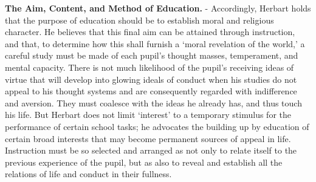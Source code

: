 \documentclass[
]{book}
\begin{document}
\textbf{The Aim, Content, and Method of Education.} - Accordingly, Herbart holds that the purpose of education should be to establish moral and religious character. He believes that this final aim can be attained through instruction, and that, to determine how this shall furnish a `moral revelation of the world,' a careful study must be made of each pupil's thought masses, temperament, and mental capacity. There is not much likelihood of the pupil's receiving ideas of virtue that will develop into glowing ideals of conduct when his studies do not appeal to his thought systems and are consequently regarded with indifference and aversion. They must coalesce with the ideas he already has, and thus touch his life. But Herbart does not limit `interest' to a temporary stimulus for the performance of certain school tasks; he advocates the building up by education of certain broad interests that may become permanent sources of appeal in life. Instruction must be so selected and arranged as not only to relate itself to the previous experience of the pupil, but as also to reveal and establish all the relations of life and conduct in their fullness.
\end{document}
